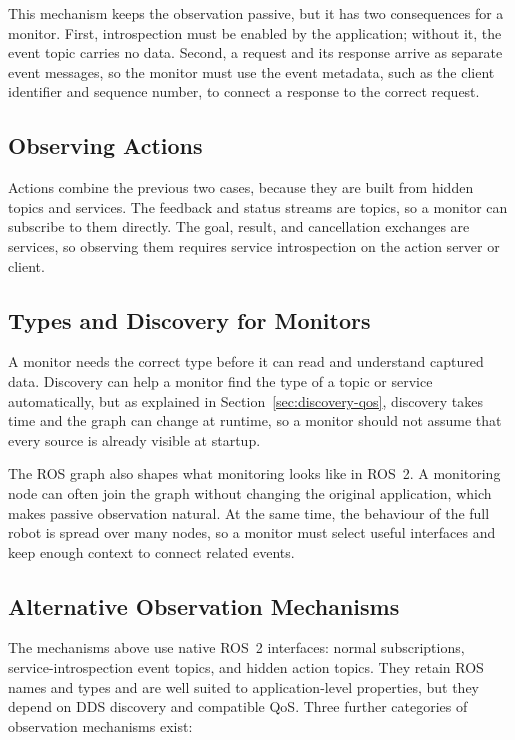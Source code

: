 This mechanism keeps the observation passive, but it has two consequences for
a monitor. First, introspection must be enabled by the application; without
it, the event topic carries no data. Second, a request and its response arrive
as separate event messages, so the monitor must use the event metadata, such
as the client identifier and sequence number, to connect a response to the
correct request.

\subsection{Observing Actions}

Actions combine the previous two cases, because they are built from hidden
topics and services. The feedback and status streams are topics, so a monitor
can subscribe to them directly. The goal, result, and cancellation exchanges
are services, so observing them requires service introspection on the action
server or client.

\subsection{Types and Discovery for Monitors}

A monitor needs the correct type before it can read and understand captured data.
Discovery can help a monitor find the type of a topic or service
automatically, but as explained in Section~\ref{sec:discovery-qos}, discovery
takes time and the graph can change at runtime, so a monitor should not assume
that every source is already visible at startup.

The ROS graph also shapes what monitoring looks like in ROS~2. A monitoring
node can often join the graph without changing the original application, which
makes passive observation natural. At the same time, the behaviour of the full
robot is spread over many nodes, so a monitor must select useful interfaces
and keep enough context to connect related events.

\subsection{Alternative Observation Mechanisms}
\label{sec:observation-mechanisms}

The mechanisms above use native ROS~2 interfaces: normal subscriptions,
service-introspection event topics, and hidden action topics. They retain ROS
names and types and are well suited to application-level properties, but they
depend on DDS discovery and compatible QoS. Three further categories of
observation mechanisms exist:

